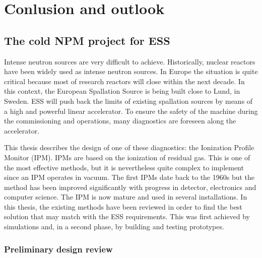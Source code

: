 \chapter{Conlusion and outlook}
\cleardoublepage

\minitoc
\section*{The cold NPM project for ESS}
Intense neutron sources are very difficult to achieve. Historically, nuclear reactors have been widely used as intense neutron sources. In Europe the situation is quite critical because most of research reactors will close within the next decade. In this context, the European Spallation Source is being built close to Lund, in Sweden. ESS will push back the limits of existing spallation sources by means of a high and powerful linear accelerator. To ensure the safety of the machine during the commissioning and operations, many diagnostics are foreseen along the accelerator.

This thesis describes the design of one of these diagnostics: the Ionization Profile Monitor (IPM). IPMs are based on the ionization of residual gas. This is one of the most effective methods, but it is nevertheless quite complex to implement since an IPM operates in vacuum. The first IPMs date back to the 1960s but the method has been improved significantly with progress in detector, electronics and computer science. The IPM is now mature and used in several installations. In this thesis, the existing methods have been reviewed in order to find the best solution that may match with the ESS requirements. This was first achieved by simulations and, in a second phase, by building and testing prototypes.

\subsection*{Preliminary design review}

